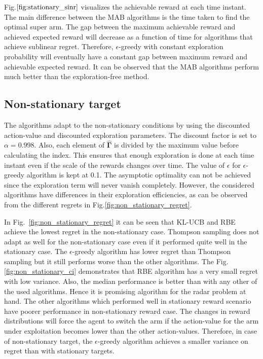 \documentclass[conference]{IEEEtran}
\newcommand{\vsinrb}{\widehat{\boldsymbol{\Gamma}}}
\begin{document}
Fig.$\ref{fig:stationary_sinr}$ visualizes the achievable reward at each time instant.
The main difference between the MAB algorithms is the time taken to find the optimal super arm.
The gap between the maximum achievable reward and achieved expected reward will decrease as a function of time for algorithms that achieve sublinear regret.
Therefore, $\epsilon$-greedy with constant exploration probability will eventually have a constant gap between maximum reward and achievable expected reward.
It can be observed that the MAB algorithms perform much better than the exploration-free method.

\subsection{Non-stationary target}


The algorithms adapt to the non-stationary conditions by using the discounted action-value and discounted exploration parameters.
The discount factor is set to $\alpha = 0.998$.
Also, each element of $\vsinrb$ is divided by the maximum value before calculating the index.
This ensures that enough exploration is done at each time instant even if the scale of the rewards changes over time.
The value of $\epsilon$ for $\epsilon$-greedy algorithm is kept at 0.1.
The asymptotic optimality can not be achieved since the exploration term will never vanish completely.
However, the considered algorithms have differences in their exploration efficiencies, as can be observed from the different regrets in Fig.\ref{fig:non_stationary_regret}.

In Fig.~\ref{fig:non_stationary_regret} it can be seen that KL-UCB and RBE achieve the lowest regret in the non-stationary case.
Thompson sampling does not adapt as well for the non-stationary case even if it performed quite well in the stationary case.
The $\epsilon$-greedy algorithm has lower regret than Thompson sampling but it still performs worse than the other algorithms. 
The Fig.\ref{fig:non_stationary_ci} demonstrates that RBE algorithm has a very small regret with low variance.
Also, the median performance is better than with any other of the used algorithms.
Hence it is promising algorithm for the radar problem at hand. 
The other algorithms which performed well in stationary reward scenario have poorer performance in non-stationary reward case.
The changes in reward distributions will force the agent to switch the arm if the action-value for the arm under exploitation becomes lower than the other action-values.
Therefore, in case of non-stationary target, the $\epsilon$-greedy algorithm achieves a smaller variance on regret than with stationary targets.
\end{document}
